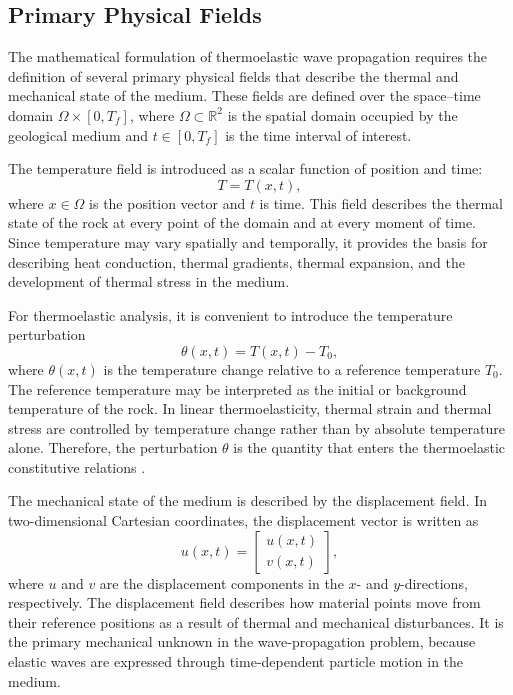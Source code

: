 \subsection{Primary Physical Fields}

The mathematical formulation of thermoelastic wave propagation requires the definition of several primary physical fields that describe the thermal and mechanical state of the medium. These fields are defined over the space--time domain \(\Omega \times [0,T_f]\), where \(\Omega \subset \mathbb{R}^2\) is the spatial domain occupied by the geological medium and \(t \in [0,T_f]\) is the time interval of interest.

The temperature field is introduced as a scalar function of position and time:
\begin{equation}
T = T(x,t),
\end{equation}
where \(x \in \Omega\) is the position vector and \(t\) is time. This field describes the thermal state of the rock at every point of the domain and at every moment of time. Since temperature may vary spatially and temporally, it provides the basis for describing heat conduction, thermal gradients, thermal expansion, and the development of thermal stress in the medium.

For thermoelastic analysis, it is convenient to introduce the temperature perturbation
\begin{equation}
\theta(x,t) = T(x,t) - T_0,
\end{equation}
where \(\theta(x,t)\) is the temperature change relative to a reference temperature \(T_0\). The reference temperature may be interpreted as the initial or background temperature of the rock. In linear thermoelasticity, thermal strain and thermal stress are controlled by temperature change rather than by absolute temperature alone. Therefore, the perturbation \(\theta\) is the quantity that enters the thermoelastic constitutive relations \cite{boley1960,nowacki1986}.

The mechanical state of the medium is described by the displacement field. In two-dimensional Cartesian coordinates, the displacement vector is written as
\begin{equation}
u(x,t)
=
\begin{bmatrix}
u(x,t) \\
v(x,t)
\end{bmatrix},
\end{equation}
where \(u\) and \(v\) are the displacement components in the \(x\)- and \(y\)-directions, respectively. The displacement field describes how material points move from their reference positions as a result of thermal and mechanical disturbances. It is the primary mechanical unknown in the wave-propagation problem, because elastic waves are expressed through time-dependent particle motion in the medium.

